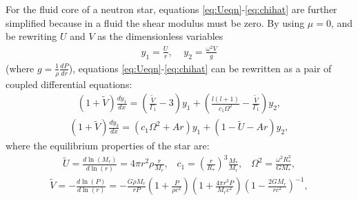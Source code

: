 \documentclass[fleqn,usenatbib]{mnras}
\begin{document}
\hspace{\parindent}For the fluid core of a neutron star, equations \ref{eq:Ueqn}-\ref{eq:chihat} are further simplified because in a fluid the shear modulus must be zero. By using $\mu=0$, and be rewriting $U$ and $V$ as the dimensionless variables
\begin{align}
y_1=\frac{U}{r},\;\;\;\;y_2=\frac{\omega^2V}{g}
\label{eq:y1y2}
\end{align}
\noindent (where $g=\frac{1}{\rho}\frac{dP}{dr}$), 
equations \ref{eq:Ueqn}-\ref{eq:chihat} can be rewritten as a pair of coupled differential equations:
\begin{align}
\left(1+\tilde{V}\right)\frac{dy_1}{dx}=\left(\frac{\tilde{V}}{\Gamma_1}-3\right)y_1+\left(\frac{l(l+1)}{c_1\Omega^2}-\frac{\tilde{V}}{\Gamma_1}\right)y_2,
\label{eq:McDy1}
\end{align}
\begin{align}
\left(1+\tilde{V}\right)\frac{dy_2}{dx}=\left(c_1\Omega^2+Ar\right)y_1+\left(1-\tilde{U}-Ar\right)y_2,
\label{eq:McDy2}
\end{align}
\noindent where the equilibrium properties of the star are: 
\begin{align}\nonumber
\tilde{U}=\frac{d\ln\left(M_r\right)}{d\ln\left(r\right)}=4\pi r^2\rho\frac{r}{M_r},\;\;\;c_1=\left(\frac{r}{R_*}\right)^3\frac{M_*}{M_r},\;\;\;\Omega^2=\frac{\omega^2R_*^3}{GM_*},
\end{align}
\begin{align}\nonumber
\tilde{V}=-\frac{d\ln\left(P\right)}{d\ln\left(r\right)}=-\frac{G\rho M_r}{rP}\left(1+\frac{P}{\rho c^2}\right)\left(1+\frac{4\pi r^3 P}{M_r c^2}\right)\left(1-\frac{2GM_r}{rc^2}\right)^{-1},
\end{align}
\end{document}
